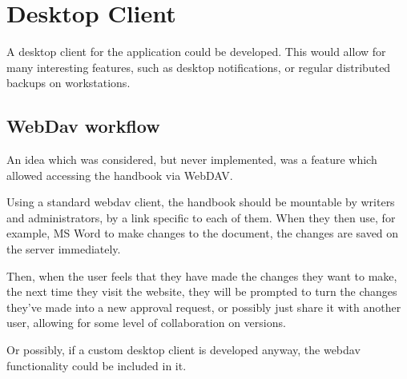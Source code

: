\documentclass[../../master.tex]{subfiles}
\begin{document}
\section{Desktop Client}
A desktop client for the application could be developed. This would allow for many interesting features, such as desktop notifications, or regular distributed backups on workstations.
\subsection{WebDav workflow}
An idea which was considered, but never implemented, was a feature which allowed accessing the handbook via WebDAV.

Using a standard webdav client, the handbook should be mountable by writers and administrators, by a link specific to each of them. When they then use, for example, MS Word to make changes to the document, the changes are saved on the server immediately.

Then, when the user feels that they have made the changes they want to make, the next time they visit the website, they will be prompted to turn the changes they've made into a new approval request, or possibly just share it with another user, allowing for some level of collaboration on versions.

Or possibly, if a custom desktop client is developed anyway, the webdav functionality could be included in it.
\end{document}
